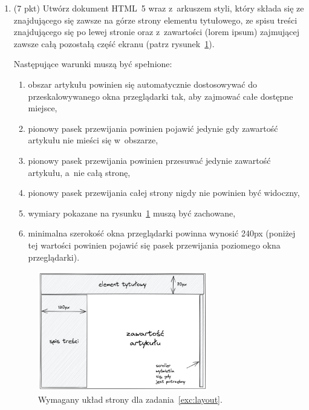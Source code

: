 \documentclass[12pt]{article}
\begin{document}
\begin{enumerate}
        \item\label{exc:layout}
            (7 pkt) Utwórz dokument HTML~5 wraz z~arkuszem styli, który składa się ze znajdującego się zawsze na górze strony elementu tytułowego, ze spisu treści znajdującego się po lewej stronie oraz z~zawartości (lorem ipsum) zajmującej zawsze całą pozostałą część ekranu (patrz rysunek~\ref{fig:layout}).

            Następujące warunki muszą być spełnione:
            \begin{enumerate}
                \item obszar artykułu powinien się automatycznie dostosowywać do przeskalowywanego okna przeglądarki tak, aby zajmować całe dostępne miejsce,
                \item pionowy pasek przewijania powinien pojawić jedynie gdy zawartość artykułu nie mieści się w~obszarze,
                \item pionowy pasek przewijania powinien przesuwać jedynie zawartość artykułu, a~nie całą stronę,
                \item pionowy pasek przewijania całej strony nigdy nie powinien być widoczny,
                \item wymiary pokazane na rysunku~\ref{fig:layout} muszą być zachowane,
                \item minimalna szerokość okna przeglądarki powinna wynosić 240px (poniżej tej wartości powinien pojawić się pasek przewijania poziomego okna przeglądarki).
            \end{enumerate}

            \begin{figure}[p]
                \centering
                \includegraphics[width=0.7\textwidth]{lista-1-2}
                \caption{Wymagany układ strony dla zadania~\ref{exc:layout}.}
                \label{fig:layout}
            \end{figure}


\end{enumerate}
\end{document}
